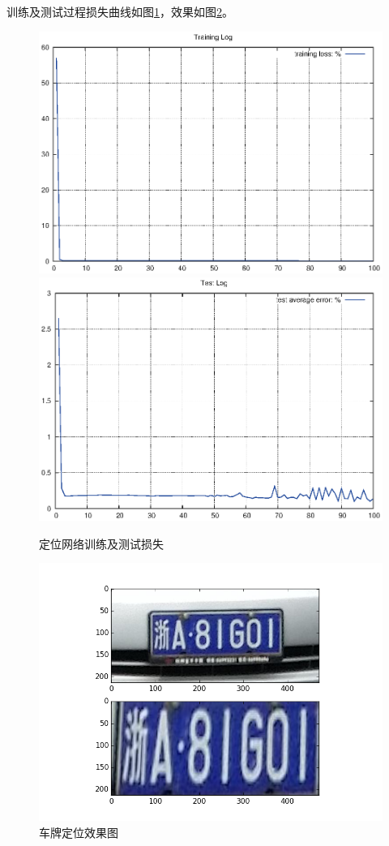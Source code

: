 训练及测试过程损失曲线如图\ref{Fig:LocalizationLogs}，效果如图\ref{Fig:LocalizationDemo}。

\begin{figure}[ht]
\centering
{}
{\includegraphics[width=0.45\linewidth]{./Figure/LocalizationTrainLog.eps}}
{\includegraphics[width=0.45\linewidth]{./Figure/LocalizationTestLog.eps}}
\caption{定位网络训练及测试损失}\label{Fig:LocalizationLogs}
\end{figure}

\begin{figure}[ht]
\centering
\includegraphics[width=1.0\linewidth]{./Figure/LocalizationDemo.png}
\caption{车牌定位效果图}\label{Fig:LocalizationDemo}
\end{figure}

